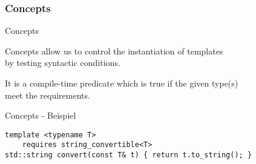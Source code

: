 \subsubsection{Concepts}

\begin{frame}{Concepts}
    \begin{center}
        Concepts allow us to control the instantiation of templates\\by testing syntactic conditions.

        \vspace{2.5em}

        It is a compile-time predicate which is true if the given type(s)\\meet the requirements.
    \end{center}
\end{frame}

\begin{frame}[fragile]{Concepts - Beispiel}
    \begin{verbatim}
template <typename T>
    requires string_convertible<T>
std::string convert(const T& t) { return t.to_string(); }
    \end{verbatim}
\end{frame}